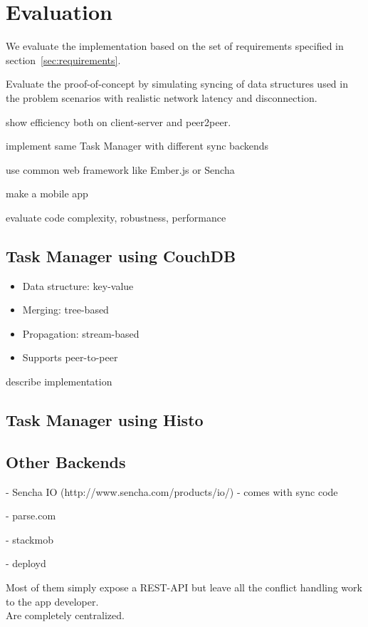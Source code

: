 
\chapter{Evaluation}\label{evaluation}

We evaluate the implementation based on the set of requirements specified in section~\ref{sec:requirements}.

Evaluate the proof-of-concept by simulating syncing of data structures
used in the problem scenarios with realistic network latency and
disconnection.

show efficiency both on client-server and peer2peer.

implement same Task Manager with different sync backends

use common web framework like Ember.js or Sencha

make a mobile app

evaluate code complexity, robustness, performance

\section{Task Manager using CouchDB}

\begin{itemize}
\item
  Data structure: key-value
\item
  Merging: tree-based
\item
  Propagation: stream-based
\item
  Supports peer-to-peer
\end{itemize}

describe implementation

\section{Task Manager using Histo}

\section{Other Backends}
- Sencha IO (http://www.sencha.com/products/io/) - comes with sync code

- parse.com

- stackmob

- deployd

Most of them simply expose a REST-API but leave all the conflict handling work to the app developer.\\
Are completely centralized.